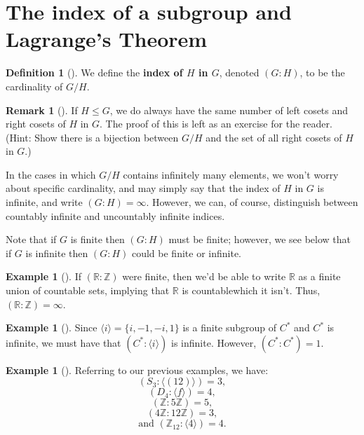\documentclass[10pt,]{book}
\newcommand{\terminology}[1]{\textbf{#1}}
\theoremstyle{plain}
\theoremstyle{definition}
\newtheorem{definition}[theorem]{Definition}
\theoremstyle{definition}
\newtheorem{remark}[theorem]{Remark}
\theoremstyle{definition}
\newtheorem{example}[theorem]{Example}
\theoremstyle{definition}
\numberwithin{equation}{section}
\def\Z{\mathbb{Z}}
\def\R{\mathbb{R}}
\begin{document}
\section[{The index of a subgroup and Lagrange's Theorem}]{The index of a subgroup and Lagrange's Theorem}\label{section-24}
\begin{definition}[{}]\label{definition-64}
We define the \terminology{index of \(H\) in \(G\)}, denoted \((G:H)\), to be the cardinality of \(G/H\).%
\label{notation-40}
\end{definition}
\begin{remark}[]\label{remark-40}
If \(H\leq G\), we do always have the same number of left cosets and right cosets of \(H\) in \(G\). The proof of this is left as an exercise for the reader.  (Hint: Show there is a bijection between \(G/H\) and the set of all right cosets of \(H\) in \(G\).)%
\end{remark}
In the cases in which \(G/H\) contains infinitely many elements, we won't worry about specific cardinality, and may simply say that the index of \(H\) in \(G\) is infinite, and write \((G:H)=\infty\). However, we can, of course, distinguish between countably infinite and uncountably infinite indices.%
\par
Note that if \(G\) is finite then \((G:H)\) must be finite; however, we see below that if \(G\) is infinite then \((G:H)\) could be finite or infinite.%
\begin{example}[]\label{example-74}
If \((\R:\Z)\) were finite, then we'd be able to write \(\R\) as a finite union of countable sets, implying that \(\R\) is countable\textemdash{}which it isn't. Thus, \((\R:\Z)=\infty\).%
\end{example}
\begin{example}[]\label{example-75}
Since \(\langle i\rangle =\{i,-1,-i,1\}\) is a finite subgroup of \(C^*\) and \(C^*\) is infinite, we must have that \((C^*:\langle i\rangle )\) is infinite. However, \((C^*:C^*)=1\).%
\end{example}
\begin{example}[]\label{indices_ex}
Referring to our previous examples, we have: %
\begin{equation*}
(S_3:\langle (12)\rangle )=3,
\end{equation*}
%
\begin{equation*}
(D_4:\langle f\rangle )=4,
\end{equation*}
%
\begin{equation*}
(\Z:5\Z)=5,
\end{equation*}
%
\begin{equation*}
(4\Z:12\Z)=3,
\end{equation*}
%
\begin{equation*}
\text{and }(\Z_{12}:\langle 4\rangle )=4.
\end{equation*}
%
\end{example}
\end{document}
